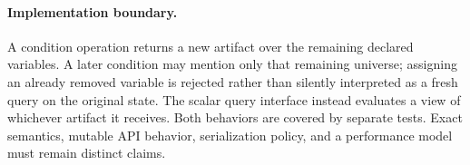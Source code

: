 \paragraph{Implementation boundary.}
A condition operation returns a new artifact over the remaining declared variables. A later condition may mention only that remaining universe; assigning an already removed variable is rejected rather than silently interpreted as a fresh query on the original state. The scalar query interface instead evaluates a view of whichever artifact it receives. Both behaviors are covered by separate tests. Exact semantics, mutable API behavior, serialization policy, and a performance model must remain distinct claims.
